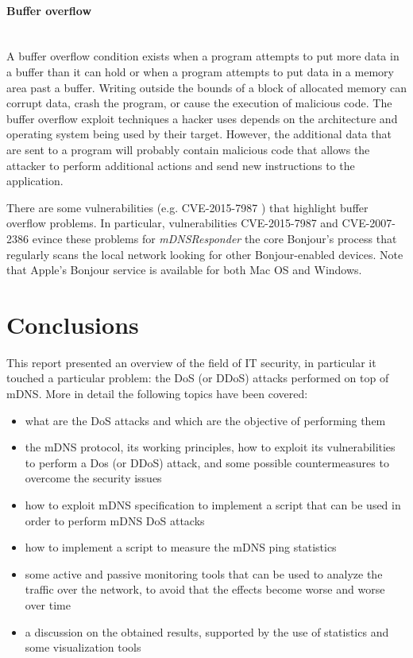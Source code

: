 \documentclass[fleqn, 11pt]{SelfArx} %
\begin{document}
\paragraph{Buffer overflow}\mbox{}\\
A buffer overflow condition exists when a program attempts to put more data in a buffer than it can hold or when a program attempts to put data in a memory area past a buffer. Writing outside the bounds of a block of allocated memory can corrupt data, crash the program, or cause the execution of malicious code. The buffer overflow exploit techniques a hacker uses depends on the architecture and operating system being used by their target. However, the additional data that are sent to a program will probably contain malicious code that allows the attacker to perform additional actions and send new instructions to the application. 

There are some vulnerabilities (e.g. CVE-2015-7987 \cite{CVE-2015-7987}) that highlight buffer overflow problems. In particular, vulnerabilities CVE-2015-7987 \cite{CVE-2015-7987} and CVE-2007-2386 \cite{CVE-2007-2386} evince these problems for
\textit{mDNSResponder} the core Bonjour's process that regularly scans the local network looking for other Bonjour-enabled devices. Note that Apple's Bonjour service is available for both Mac OS and Windows.  

\section{Conclusions}
This report presented an overview of the field of IT security, in particular it touched a particular problem: the DoS (or DDoS) attacks performed on top of mDNS. \newline
More in detail the following topics have been covered:
\begin{itemize}[leftmargin=*]
	\item what are the DoS attacks and which are the objective of performing them 
	\item the mDNS protocol, its working principles, how to exploit its vulnerabilities to perform a Dos (or DDoS) attack, and some possible 
		  countermeasures to overcome the security issues
 	\item how to exploit mDNS specification to implement a script that can be used in order to perform mDNS DoS attacks
 	\item how to implement a script to measure the mDNS ping statistics
	\item some active and passive monitoring tools that can be used to analyze the traffic over the network,
	      to avoid that the effects become worse and worse over time
 	\item a discussion on the obtained results, supported by the use of statistics and some visualization tools
\end{itemize}
\end{document}
